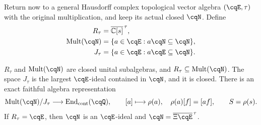 Return now to a general Hausdorff complex topological vector
algebra $(\cqE,\tau)$ with the original multiplication, and
keep its actual closed $\cqN$. Define
\begin{equation}
 \begin{aligned}
 R_\tau&=\overline{\mathbb C[s]}^{\,\tau},\\
 \operatorname{Mult}(\cqN)&=\{a\in\cqE:a\cqN\subseteq\cqN\},\\
 J_\tau&=\{a\in\cqE:a\cqE\subseteq\cqN\}.
 \end{aligned}
 \label{eq:cq-ring-multiplier-annihilator}
\end{equation}

\begin{cqproposition}
\label{thm:cq-ring-multiplier-representation}
$R_\tau$ and $\operatorname{Mult}(\cqN)$ are closed unital
subalgebras, and
$R_\tau\subseteq\operatorname{Mult}(\cqN)$.
The space $J_\tau$ is the largest $\cqE$-ideal contained
in $\cqN$, and it is closed. There is an exact faithful
algebra representation
\begin{equation}
 \operatorname{Mult}(\cqN)/J_\tau
 \longrightarrow\operatorname{End}_{\rm cont}(\cqQ),
 \qquad [a]\longmapsto\rho(a),\quad
 \rho(a)[f]=[af],\qquad S=\rho(s).
 \label{eq:cq-ring-quotient-representation}
\end{equation}
If $R_\tau=\cqE$, then $\cqN$ is an $\cqE$-ideal and
$\cqN=\overline{\Xi\cqE}^{\,\tau}$.
\end{cqproposition}

